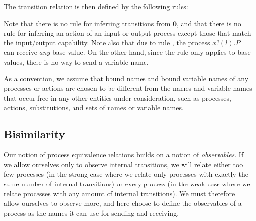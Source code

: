\documentclass[a4paper]{article}
\newcommand{\Pend}{\bm{0}}
\newcommand{\Ppar}[2]{#1 \mid #2}
\newcommand{\Pres}[2]{(\bm{\nu} #1)~#2}
\newcommand{\Pout}[3]{#1 ! #2 . #3}
\newcommand{\Pin}[3]{#1 ? (#2) . #3}
\newcommand{\Preplicate}[1]{{!}#1}
\newcommand{\names}[1]{\textrm{n}(#1)}
\newcommand{\subst}[3]{#1\{#2/#3\}}
\newcommand{\Aoutf}[2]{#1 ! #2}
\newcommand{\Ain}[2]{#1 ? #2}
\newcommand{\Atau}{\tau}
\newcommand{\transition}[3]{#1 \xrightarrow{#2} #3}
\begin{document}
The transition relation is then defined by the following rules:
Note that there is no rule for inferring transitions from \( \Pend \), and that there is no rule for inferring an action of an input or output process except those that match the input/output capability.
Note also that due to rule , the process \( \Pin{x}{l}{P} \) can receive \emph{any} base value.
On the other hand, since the rule  only applies to base values, there is no way to send a variable name.

As a convention, we assume that bound names and bound variable names of any processes or actions are chosen to be different from the names and variable names that occur free in any other entities under consideration, such as processes, actions, substitutions, and sets of names or variable names.

\subsection{Bisimilarity}
Our notion of process equivalence relations builds on a notion of \emph{observables}.
If we allow ourselves only to observe internal transitions, we will relate either too few processes (in the strong case where we relate only processes with exactly the same number of internal transitions) or every process (in the weak case where we relate processes with any amount of internal transitions).
We must therefore allow ourselves to observe more, and here choose to define the observables of a process as the names it can use for sending and receiving.
\end{document}
